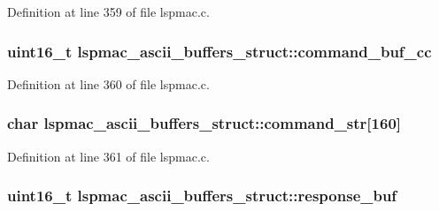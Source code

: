 Definition at line 359 of file lspmac.\-c.

\hypertarget{structlspmac__ascii__buffers__struct_a4d11efeb1eef407d811d3f9b774adc54}{
\subsubsection[{command\-\_\-buf\-\_\-cc}]{\setlength{\rightskip}{0pt plus 5cm}uint16\-\_\-t lspmac\-\_\-ascii\-\_\-buffers\-\_\-struct\-::command\-\_\-buf\-\_\-cc}}\label{structlspmac__ascii__buffers__struct_a4d11efeb1eef407d811d3f9b774adc54}


Definition at line 360 of file lspmac.\-c.

\hypertarget{structlspmac__ascii__buffers__struct_abe6a433dd9be4781dbf7e31d16484a4b}{
\subsubsection[{command\-\_\-str}]{\setlength{\rightskip}{0pt plus 5cm}char lspmac\-\_\-ascii\-\_\-buffers\-\_\-struct\-::command\-\_\-str\mbox{[}160\mbox{]}}}\label{structlspmac__ascii__buffers__struct_abe6a433dd9be4781dbf7e31d16484a4b}


Definition at line 361 of file lspmac.\-c.

\hypertarget{structlspmac__ascii__buffers__struct_ae1d37cf9568478c9d8dad540ce77183c}{
\subsubsection[{response\-\_\-buf}]{\setlength{\rightskip}{0pt plus 5cm}uint16\-\_\-t lspmac\-\_\-ascii\-\_\-buffers\-\_\-struct\-::response\-\_\-buf}}\label{structlspmac__ascii__buffers__struct_ae1d37cf9568478c9d8dad540ce77183c}


